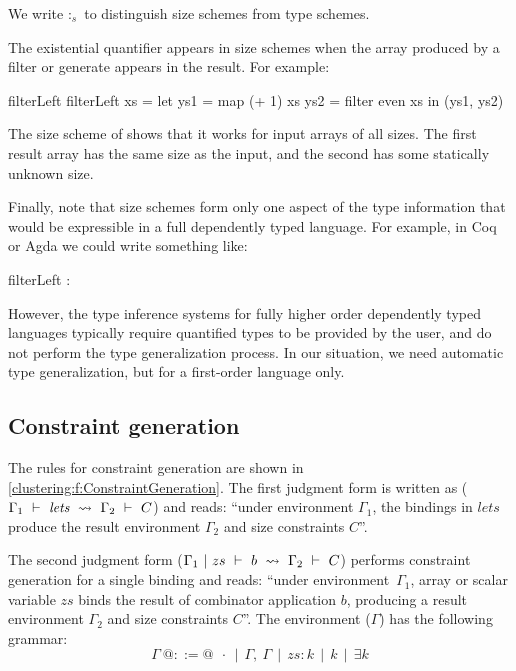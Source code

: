 We write $:_s$ to distinguish size schemes from type schemes.

The existential quantifier appears in size schemes when the array produced by a filter or generate appears in the result.
For example:

\begin{haskell}
filterLeft %
filterLeft xs
  = let ys1 = map (+ 1)   xs
        ys2 = filter even xs
    in (ys1, ys2)
\end{haskell}

The size scheme of \Hs@filterLeft@ shows that it works for input arrays of all sizes.
The first result array has the same size as the input, and the second has some statically unknown size.

Finally, note that size schemes form only one aspect of the type information that would be expressible in a full dependently typed language.
For example, in Coq or Agda we could write something like:

\begin{haskell}
filterLeft : %
\end{haskell}

However, the type inference systems for fully higher order dependently typed languages typically require quantified types to be provided by the user, and do not perform the type generalization process.
In our situation, we need automatic type generalization, but for a first-order language only.



\subsection{Constraint generation}
The rules for constraint generation are shown in \cref{clustering:f:ConstraintGeneration}.
The first judgment form is written as ($\Gamma_1 ~\vdash~ \textit{lets} ~\leadsto~ \Gamma_2 ~\vdash~ C$) and reads: ``under environment $\Gamma_1$, the bindings in $\textit{lets}$ produce the result environment $\Gamma_2$ and size constraints $C$''.

\pagebreak
The second judgment form ($\Gamma_1 ~|~ zs ~\vdash~ b ~\leadsto~ \Gamma_2 ~\vdash~ C$) performs constraint generation for a single binding and reads: ``under environment~$\Gamma_1$, array or scalar variable $zs$ binds the result of combinator application $b$, producing a result environment $\Gamma_2$ and size constraints $C$''.
The environment ($\Gamma$) has the following grammar:
$$
\Gamma~ @::=@ ~~\cdot ~~|~~ \Gamma,~ \Gamma ~~|~~ zs : k ~~|~~ k ~~|~~ \exists k
$$

